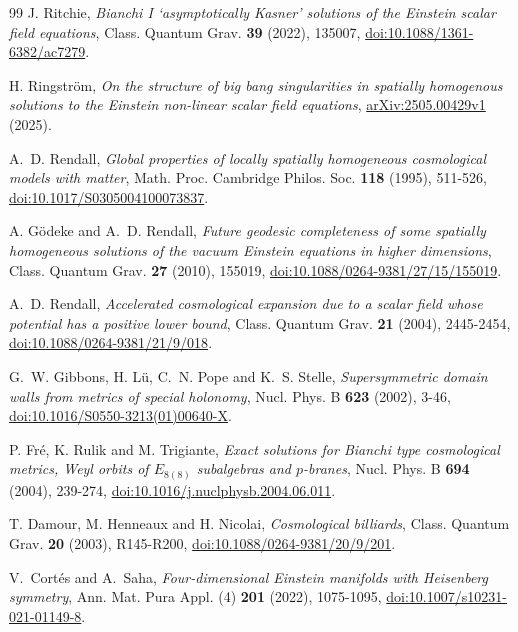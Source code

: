 \documentclass[10pt,a4paper]{article}
\numberwithin{equation}{section}
\theoremstyle{definition}
\theoremstyle{remark}
\begin{document}
\begin{thebibliography}{99}
J. Ritchie,
\emph{Bianchi I `asymptotically Kasner' solutions of the Einstein scalar
field equations},
Class. Quantum Grav. \textbf{39} (2022), 135007,
\href{https://doi.org/10.1088/1361-6382/ac7279}
{doi:10.1088/1361-6382/ac7279}.

H. Ringstr\"om,
\emph{On the structure of big bang singularities in spatially homogenous
solutions to the Einstein non-linear scalar field equations},
\href{https://arxiv.org/abs/2505.00429v1}{arXiv:2505.00429v1} (2025).

A.~D. Rendall,
\emph{Global properties of locally spatially homogeneous cosmological models
with matter},
Math. Proc. Cambridge Philos. Soc. \textbf{118} (1995), 511-526,
\href{https://doi.org/10.1017/S0305004100073837}
{doi:10.1017/S0305004100073837}.

A. G\"odeke and A.~D. Rendall,
\emph{Future geodesic completeness of some spatially homogeneous solutions
of the vacuum Einstein equations in higher dimensions},
Class. Quantum Grav. \textbf{27} (2010), 155019,
\href{https://doi.org/10.1088/0264-9381/27/15/155019}
{doi:10.1088/0264-9381/27/15/155019}.

A.~D. Rendall,
\emph{Accelerated cosmological expansion due to a scalar field whose
potential has a positive lower bound},
Class. Quantum Grav. \textbf{21} (2004), 2445-2454,
\href{https://doi.org/10.1088/0264-9381/21/9/018}
{doi:10.1088/0264-9381/21/9/018}.

G.~W. Gibbons, H. L\"u, C.~N. Pope and K.~S. Stelle,
\emph{Supersymmetric domain walls from metrics of special holonomy},
Nucl. Phys. B \textbf{623} (2002), 3-46,
\href{https://doi.org/10.1016/S0550-3213(01)00640-X}
{doi:10.1016/S0550-3213(01)00640-X}.

P. Fr\'e, K. Rulik and M. Trigiante,
\emph{Exact solutions for Bianchi type cosmological metrics, Weyl orbits
of $E_{8(8)}$ subalgebras and $p$-branes},
Nucl. Phys. B \textbf{694} (2004), 239-274,
\href{https://doi.org/10.1016/j.nuclphysb.2004.06.011}
{doi:10.1016/j.nuclphysb.2004.06.011}.

T. Damour, M. Henneaux and H. Nicolai,
\emph{Cosmological billiards},
Class. Quantum Grav. \textbf{20} (2003), R145-R200,
\href{https://doi.org/10.1088/0264-9381/20/9/201}
{doi:10.1088/0264-9381/20/9/201}.

V.~Cort\'es and A.~Saha,
\emph{Four-dimensional Einstein manifolds with Heisenberg symmetry},
Ann. Mat. Pura Appl. (4) \textbf{201} (2022), 1075-1095,
\href{https://doi.org/10.1007/s10231-021-01149-8}
{doi:10.1007/s10231-021-01149-8}.


\end{thebibliography}
\end{document}
